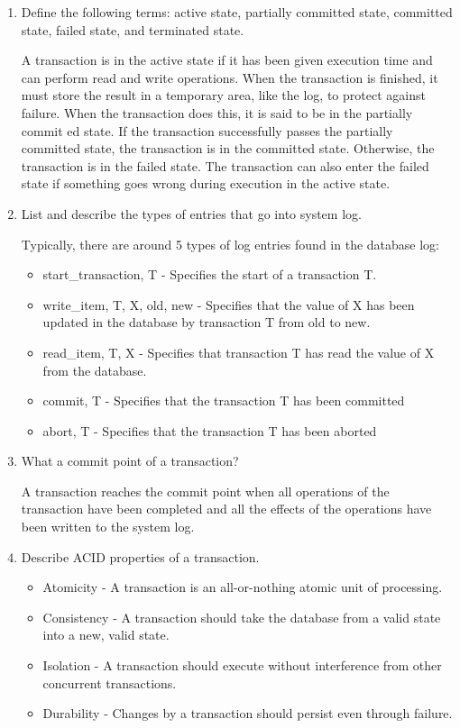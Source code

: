 \documentclass[11pt]{article}
\begin{document}
\begin{enumerate}
		\item Define the following terms: active state, partially committed state, committed state, failed state, and terminated state.
		
		A transaction is in the active state if it has been given execution time and can perform read and write operations. When the transaction is finished, it must store the result in a temporary area, like the log, to protect against failure. When the transaction does this, it is said to be in the partially commit ed state. If the transaction successfully passes the partially committed state, the transaction is in the committed state. Otherwise, the transaction is in the failed state. The transaction can also enter the failed state if something goes wrong during execution in the active state.
		
		\item List and describe the types of entries that go into system log.
		
		Typically, there are around 5 types of log entries found in the database log:
		\begin{itemize}
			\item start\_transaction, T - Specifies the start of a transaction T.
			\item write\_item, T, X, old, new - Specifies that the value of X has been updated in the database by transaction T from old to new.
			\item read\_item, T, X - Specifies that transaction T has read the value of X from the database.
			\item commit, T - Specifies that the transaction T has been committed
			\item abort, T - Specifies that the transaction T has been aborted
		\end{itemize}
				
		\item What a commit point of a transaction?
		
		A transaction reaches the commit point when all operations of the transaction have been completed and all the effects of the operations have been written to the system log.
		
		\item Describe ACID properties of a transaction.
		
		\begin{itemize}
			\item Atomicity - A transaction is an all-or-nothing atomic unit of processing.
			\item Consistency - A transaction should take the database from a valid state into a new, valid state.
			\item Isolation - A transaction should execute without interference from other concurrent transactions.
			\item Durability - Changes by a transaction should persist even through failure.
		\end{itemize}
		

\end{enumerate}
\end{document}
